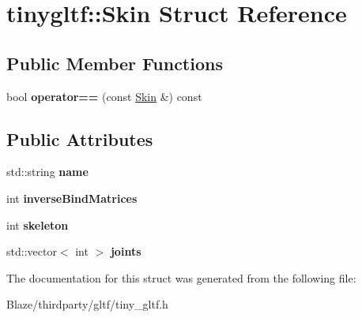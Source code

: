 \hypertarget{structtinygltf_1_1Skin}{}\section{tinygltf\+:\+:Skin Struct Reference}
\label{structtinygltf_1_1Skin}
\subsection*{Public Member Functions}
\begin{DoxyCompactItemize}
\item 
\mbox{\label{structtinygltf_1_1Skin_a51deba27f6291918507936fb6216c349}} 
bool {\bfseries operator==} (const \hyperlink{structtinygltf_1_1Skin}{Skin} \&) const
\end{DoxyCompactItemize}
\subsection*{Public Attributes}
\begin{DoxyCompactItemize}
\item 
\mbox{\label{structtinygltf_1_1Skin_ad4a79a93764c78e2581e814fbe83efab}} 
std\+::string {\bfseries name}
\item 
\mbox{\label{structtinygltf_1_1Skin_a80a7b64e50d3bd204904d21270a3ab90}} 
int {\bfseries inverse\+Bind\+Matrices}
\item 
\mbox{\label{structtinygltf_1_1Skin_a15b6b421b86e6a59c0aaa3bd34c6db5a}} 
int {\bfseries skeleton}
\item 
\mbox{\label{structtinygltf_1_1Skin_a83a8efcef03218f88803953f81ae7543}} 
std\+::vector$<$ int $>$ {\bfseries joints}
\end{DoxyCompactItemize}


The documentation for this struct was generated from the following file\+:\begin{DoxyCompactItemize}
\item 
Blaze/thirdparty/gltf/tiny\+\_\+gltf.\+h\end{DoxyCompactItemize}
